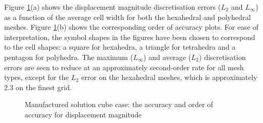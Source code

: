 \documentclass[sn-mathphys,Numbered]{sn-jnl}%
\begin{document}
Figure \ref{fig:mms_disp_accuracy}(a) shows the displacement magnitude discretisation errors ($L_2$ and $L_\infty$) as a function of the average cell width for both the hexahedral and polyhedral meshes.
Figure \ref{fig:mms_disp_accuracy}(b) shows the corresponding order of accuracy plots.
For ease of interpretation, the symbol shapes in the figures have been chosen to correspond to the cell shapes: a square for hexahedra, a triangle for tetrahedra and a pentagon for polyhedra.
The maximum ($L_\infty$) and average ($L_2$) discretisation errors are seen to reduce at an approximately second-order rate for all mesh types, except for the $L_2$ error on the hexahedral meshes, which is approximately 2.3 on the finest grid.
\begin{figure}[htbp]
	\centering
	\caption{Manufactured solution cube case: the accuracy and order of accuracy for displacement magnitude}
	\label{fig:mms_disp_accuracy}
\end{figure}
\end{document}
